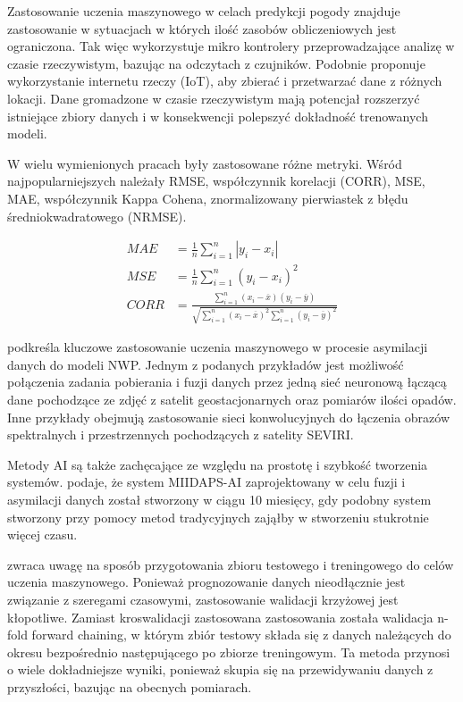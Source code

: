 Zastosowanie uczenia maszynowego w celach predykcji pogody znajduje zastosowanie
w sytuacjach w których ilość zasobów obliczeniowych jest ograniczona. Tak więc
\cite{weather-forecasting-using-ml} wykorzystuje
mikro kontrolery przeprowadzające analizę w czasie rzeczywistym, bazując na odczytach z 
czujników. Podobnie \cite{smart-weather-forecasting}
proponuje wykorzystanie internetu rzeczy (IoT), aby zbierać i przetwarzać dane z różnych lokacji.
Dane gromadzone w czasie rzeczywistym mają potencjał rozszerzyć istniejące zbiory danych
i w konsekwencji polepszyć dokładność trenowanych modeli.

W wielu wymienionych pracach \cite{development-and-application-of-ml-in}
były zastosowane różne metryki. Wśród najpopularniejszych
należały RMSE, współczynnik korelacji (CORR), MSE, MAE, współczynnik Kappa Cohena,
znormalizowany pierwiastek z błędu średniokwadratowego (NRMSE).

\begin{align*}
    MAE &= \frac{1}{n}\sum_{i=1}^n |y_i - x_i|\\
    MSE &= \frac{1}{n}\sum_{i=1}^n (y_i-x_i)^2\\
    CORR &= \frac{\sum_{i=1}^n (x_i-\overline{x})(y_i-\overline{y})}
    {\sqrt{\sum_{i=1}^n (x_i-\overline{x})^2\sum_{i=1}^n (y_i-\overline{y})^2}}
\end{align*}

\cite{ai-revolutionises-weather-prediction}
podkreśla kluczowe zastosowanie uczenia maszynowego w procesie asymilacji danych do modeli NWP.
Jednym z podanych przykładów jest możliwość połączenia zadania pobierania i fuzji danych 
przez jedną sieć neuronową łączącą dane pochodzące ze zdjęć z satelit geostacjonarnych oraz 
pomiarów ilości opadów. Inne przykłady obejmują zastosowanie sieci konwolucyjnych do łączenia
obrazów spektralnych i przestrzennych pochodzących z satelity SEVIRI. 

Metody AI są także zachęcające ze względu na prostotę i szybkość tworzenia systemów.
\cite{ai-revolutionises-weather-prediction}
podaje, że system MIIDAPS-AI zaprojektowany w celu fuzji i asymilacji danych został stworzony w ciągu 10 miesięcy, 
gdy podobny system stworzony przy pomocy metod tradycyjnych zająłby
w stworzeniu stukrotnie więcej czasu.

\cite{ml-applied-to-weather-forecasting}
zwraca uwagę na sposób przygotowania zbioru testowego i treningowego do celów uczenia 
maszynowego. Ponieważ prognozowanie danych nieodłącznie jest związanie z szeregami czasowymi,
zastosowanie walidacji krzyżowej jest kłopotliwe. Zamiast kroswalidacji zastosowana 
zastosowania została walidacja n-fold forward chaining, w którym zbiór testowy składa się 
z danych należących do okresu bezpośrednio następującego po zbiorze treningowym. Ta metoda
przynosi o wiele dokładniejsze wyniki, ponieważ skupia się na przewidywaniu danych 
z przyszłości, bazując na obecnych pomiarach.

